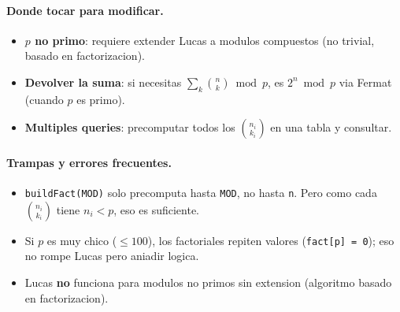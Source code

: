 \paragraph{Donde tocar para modificar.}
\begin{itemize}\setlength\itemsep{0pt}
	\item \textbf{$p$ no primo}: requiere extender Lucas a modulos compuestos (no trivial, basado en factorizacion).
	\item \textbf{Devolver la suma}: si necesitas $\sum_k \binom{n}{k} \bmod p$, es $2^n \bmod p$ via Fermat (cuando $p$ es primo).
	\item \textbf{Multiples queries}: precomputar todos los $\binom{n_i}{k_i}$ en una tabla y consultar.
\end{itemize}

\paragraph{Trampas y errores frecuentes.}
\begin{itemize}\setlength\itemsep{0pt}
	\item \texttt{buildFact(MOD)} solo precomputa hasta \texttt{MOD}, no hasta \texttt{n}. Pero como cada $\binom{n_i}{k_i}$ tiene $n_i < p$, eso es suficiente.
	\item Si $p$ es muy chico ($\le 100$), los factoriales repiten valores (\texttt{fact[p] = 0}); eso no rompe Lucas pero aniadir logica.
	\item Lucas \textbf{no} funciona para modulos no primos sin extension (algoritmo basado en factorizacion).
\end{itemize}

